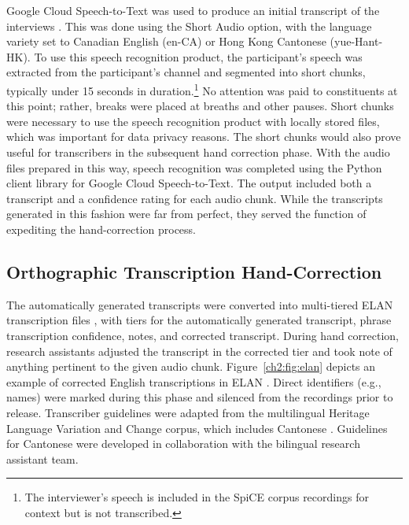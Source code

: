 Google Cloud Speech-to-Text was used to produce an initial transcript of the interviews \citep{google_2019_stt}. This was done using the Short Audio option, with the language variety set to Canadian English (en-CA) or Hong Kong Cantonese (yue-Hant-HK). To use this speech recognition product, the participant's speech was extracted from the participant's channel and segmented into short chunks, typically under 15 seconds in duration.\footnote{The interviewer's speech is included in the SpiCE corpus recordings for context but is not transcribed.} No attention was paid to constituents at this point; rather, breaks were placed at breaths and other pauses. Short chunks were necessary to use the speech recognition product with locally stored files, which was important for data privacy reasons. The short chunks would also prove useful for transcribers in the subsequent hand correction phase. With the audio files prepared in this way, speech recognition was completed using the Python client library for Google Cloud Speech-to-Text. The output included both a transcript and a confidence rating for each audio chunk. While the transcripts generated in this fashion were far from perfect, they served the function of expediting the hand-correction process.

\subsection{Orthographic Transcription Hand-Correction}\label{ch2:subsec:orthographic}

The automatically generated transcripts were converted into multi-tiered ELAN transcription files \citep{sloetjes_2008_elan}, with tiers for the automatically generated transcript, phrase transcription confidence, notes, and corrected transcript. During hand correction, research assistants adjusted the transcript in the corrected tier and took note of anything pertinent to the given audio chunk. Figure~\ref{ch2:fig:elan} depicts an example of corrected English transcriptions in ELAN \citep{sloetjes_2008_elan}. Direct identifiers (e.g., names) were marked during this phase and silenced from the recordings prior to release. Transcriber guidelines were adapted from the multilingual Heritage Language Variation and Change corpus, which includes Cantonese \citep{nagy_2011_hlvc}. Guidelines for Cantonese were developed in collaboration with the bilingual research assistant team.

